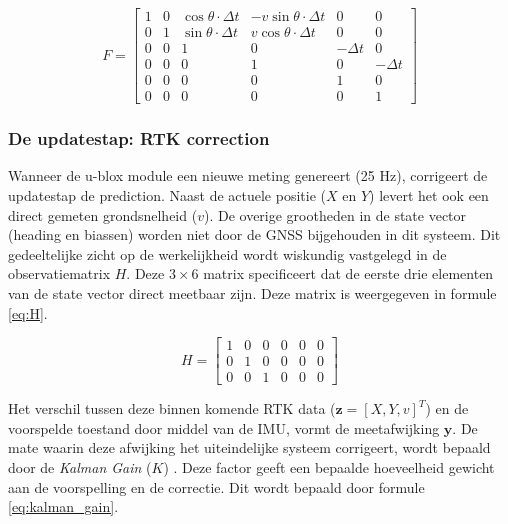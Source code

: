 \begin{equation}
F = \begin{bmatrix}
1 & 0 & \cos\theta \cdot \Delta t & -v \sin\theta \cdot \Delta t & 0          & 0          \\
0 & 1 & \sin\theta \cdot \Delta t &  v \cos\theta \cdot \Delta t & 0          & 0          \\
0 & 0 & 1                          & 0                             & -\Delta t  & 0          \\
0 & 0 & 0                          & 1                             & 0          & -\Delta t  \\
0 & 0 & 0                          & 0                             & 1          & 0          \\
0 & 0 & 0                          & 0                             & 0          & 1
\end{bmatrix}
\label{eq:jacobian_F}
\end{equation}


\subsubsection{De updatestap: RTK correction}

Wanneer de u-blox module een nieuwe meting genereert (25 Hz), corrigeert de updatestap de prediction. Naast de actuele positie ($X$ en $Y$) levert het ook een direct gemeten grondsnelheid ($v$). De overige grootheden in de state vector (heading en biassen) worden niet door de GNSS bijgehouden in dit systeem. Dit gedeeltelijke zicht op de werkelijkheid wordt wiskundig vastgelegd in de observatiematrix $H$. Deze $3 \times 6$ matrix specificeert dat de eerste drie elementen van de state vector direct meetbaar zijn. Deze matrix is weergegeven in formule \ref{eq:H}.

\begin{equation}
    H = \begin{bmatrix}
        1 & 0 & 0 & 0 & 0 & 0 \\
        0 & 1 & 0 & 0 & 0 & 0 \\
        0 & 0 & 1 & 0 & 0 & 0
    \end{bmatrix}
    \label{eq:H}
\end{equation}

Het verschil tussen deze binnen komende RTK data ($\mathbf{z} = [X, Y, v]^T$) en de voorspelde toestand door middel van de IMU, vormt de meetafwijking $\mathbf{y}$. De mate waarin deze afwijking het uiteindelijke systeem corrigeert, wordt bepaald door de \textit{Kalman Gain} ($K$) \cite{kalmanfilter_net}. Deze factor geeft een bepaalde hoeveelheid gewicht aan de voorspelling en de correctie. Dit wordt bepaald door formule \ref{eq:kalman_gain}.

